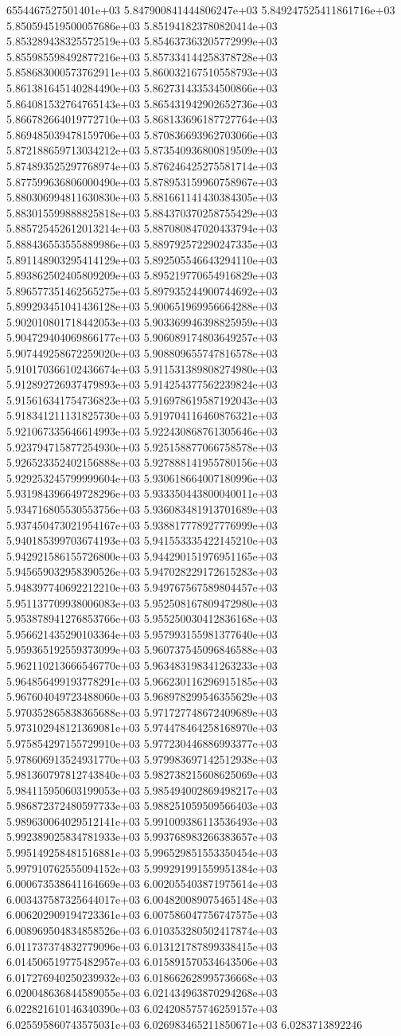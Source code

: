 6554467527501401e+03	5.847900841444806247e+03	5.849247525411861716e+03	5.850594519500057686e+03	5.851941823780820414e+03	5.853289438325572519e+03	5.854637363205772999e+03	5.855985598492877216e+03	5.857334144258378728e+03	5.858683000573762911e+03	5.860032167510558793e+03	5.861381645140284490e+03	5.862731433534500866e+03	5.864081532764765143e+03	5.865431942902652736e+03	5.866782664019772710e+03	5.868133696187727764e+03	5.869485039478159706e+03	5.870836693962703066e+03	5.872188659713034212e+03	5.873540936800819509e+03	5.874893525297768974e+03	5.876246425275581714e+03	5.877599636806000490e+03	5.878953159960758967e+03	5.880306994811630830e+03	5.881661141430384305e+03	5.883015599888825818e+03	5.884370370258755429e+03	5.885725452612013214e+03	5.887080847020433794e+03	5.888436553555889986e+03	5.889792572290247335e+03	5.891148903295414129e+03	5.892505546643294110e+03	5.893862502405809209e+03	5.895219770654916829e+03	5.896577351462565275e+03	5.897935244900744692e+03	5.899293451041436128e+03	5.900651969956664288e+03	5.902010801718442053e+03	5.903369946398825959e+03	5.904729404069866177e+03	5.906089174803649257e+03	5.907449258672259020e+03	5.908809655747816578e+03	5.910170366102436674e+03	5.911531389808274980e+03	5.912892726937479893e+03	5.914254377562239824e+03	5.915616341754736823e+03	5.916978619587192043e+03	5.918341211131825730e+03	5.919704116460876321e+03	5.921067335646614993e+03	5.922430868761305646e+03	5.923794715877254930e+03	5.925158877066758578e+03	5.926523352402156888e+03	5.927888141955780156e+03	5.929253245799999604e+03	5.930618664007180996e+03	5.931984396649728296e+03	5.933350443800040011e+03	5.934716805530553756e+03	5.936083481913701689e+03	5.937450473021954167e+03	5.938817778927776999e+03	5.940185399703674193e+03	5.941553335422145210e+03	5.942921586155726800e+03	5.944290151976951165e+03	5.945659032958390526e+03	5.947028229172615283e+03	5.948397740692212210e+03	5.949767567589804457e+03	5.951137709938006083e+03	5.952508167809472980e+03	5.953878941276853766e+03	5.955250030412836168e+03	5.956621435290103364e+03	5.957993155981377640e+03	5.959365192559373099e+03	5.960737545096846588e+03	5.962110213666546770e+03	5.963483198341263233e+03	5.964856499193778291e+03	5.966230116296915185e+03	5.967604049723488060e+03	5.968978299546355629e+03	5.970352865838365688e+03	5.971727748672409689e+03	5.973102948121369081e+03	5.974478464258168970e+03	5.975854297155729910e+03	5.977230446886993377e+03	5.978606913524931770e+03	5.979983697142512938e+03	5.981360797812743840e+03	5.982738215608625069e+03	5.984115950603199053e+03	5.985494002869498217e+03	5.986872372480597733e+03	5.988251059509566403e+03	5.989630064029512141e+03	5.991009386113536493e+03	5.992389025834781933e+03	5.993768983266383657e+03	5.995149258481516881e+03	5.996529851553350454e+03	5.997910762555094152e+03	5.999291991559951384e+03	6.000673538641164669e+03	6.002055403871975614e+03	6.003437587325644017e+03	6.004820089075465148e+03	6.006202909194723361e+03	6.007586047756747575e+03	6.008969504834858526e+03	6.010353280502417874e+03	6.011737374832779096e+03	6.013121787899338415e+03	6.014506519775482957e+03	6.015891570534643506e+03	6.017276940250239932e+03	6.018662628995736668e+03	6.020048636844589055e+03	6.021434963870294268e+03	6.022821610146340390e+03	6.024208575746259157e+03	6.025595860743575031e+03	6.026983465211850671e+03	6.0283713892246